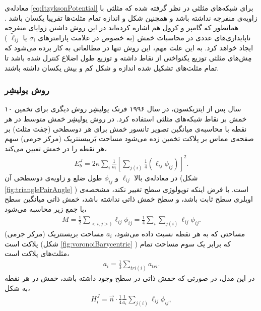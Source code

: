 معادله‌ی
\ref{eq:ItzyksonPotential}
برای شبکه‌های مثلثی در نظر گرفته شده که مثلثی با زاویه‌ی منفرجه نداشته باشد و همچنین شکل و اندازه تمام مثلث‌ها تقریبا یکسان باشد
\cite{Itzykson1986}
. همانطور که گامپر و کرول هم اشاره کرده‌اند
\cite{Gompper1996}
در این روش داشتن زوایای منفرجه ناپایداری‌های عددی در محاسبات خمش (به خصوص در علامت پارامتر‌های 
$\sigma_i$
یا
$\tilde\ell_{ij}$
) ایجاد خواهد کرد. به این علت مهم، این روش تنها  در مطالعاتی به کار برده می‌شود  که مِش‌های  مثلثی  توزیع یکنواختی از نقاط داشته و توزیع طول اضلاع کنترل شده باشد تا تمام مثلث‌های تشکیل شده اندازه و شکل کم و بیش یکسان داشته باشند.



\subsubsection{
روش یولیشِر
}
۱۰ سال پس از ایتزیکسون، در سال ۱۹۹۶ فرنک یولیشِر 
\cite{Julicher1996}
روش دیگری برای تخمین خمش بر نقاط شبکه‌های مثلثی استفاده کرد. در روش یولیشِر خمش متوسط در هر نقطه با محاسبه‌ی  میانگین تصویر تانسور خمش برای هر دوسطحی (جفت مثلث‌) بر صفحه‌ی مماس بر پلاکت  تخمین زده می‌شود
\cite{Ramakrishnan2011}
مساحت بَرییسنتریک
(مرکز جرمی) سهم هر نقطه را در خمش تعیین می‌کند،
\begin{eqnarray}
E_{b}^{J}=2\kappa\sum_{i}\frac{1}{a_i}\left[\sum_{j(i)}\frac{1}{4}(\ell_{ij}\phi_{ij})\right]^2.
\label{eq:JulicherPotential}
\end{eqnarray}
در معادله‌ی بالا 
$\ell_{ij}$
و
$\phi_{ij}$
طول ضلع و زاویه‌ی دوسطحی آن (شکل
\ref{fig:trianglePairAngle}
) است. با فرض اینکه توپولوژی سطح تغییر نکند، مشخصه‌ی اویلری سطح ثابت باشد، و سطح خمش ذاتی نداشته باشد، خمش ذاتی میانگین سطح با جمع زیر محاسبه می‌شود، 
\begin{eqnarray}
M=\frac{1}{2}\sum_{<i,j>)}\ell_{ij}\phi_{ij} = \frac{1}{4}\sum_i\sum_{j(i)}\ell_{ij}\phi_{ij}.
\label{eq:JulicherTotalMeanCurvature}
\end{eqnarray}
مساحتی که به هر نقطه نسبت داده می‌شود،
$a_i$
مساحت بریسنتریک (مرکز جرمی) پلاکت است (شکل
\ref{fig:voronoiBarycentric}
) که برابر یک سوم مساحت تمام مثلث‌های پلاکت است، 
\begin{eqnarray}
a_i=\frac{1}{3}\sum_{tri (i)}a_{tri}.
\label{eq:BarycentricArea}
\end{eqnarray}
در این مدل، در صورتی که خمش ذاتی در سطح وجود داشته باشد، خمش در هر نقطه به شکل،
\begin{eqnarray}
H_i^J=\vec n\cdot\frac{1}{4}\frac{1}{a_i}\sum_{j(i)}\ell_{ij}\phi_{ij},
\label{eq:meanCurvatureDiscreteSingleVertexJulicher}
\end{eqnarray}
